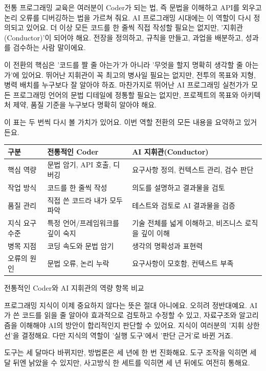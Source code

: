 전통 프로그래밍 교육은 여러분이 Coder가 되는 법, 즉 문법을 이해하고 API를 외우고 논리 오류를 디버깅하는 법을 가르쳐 줘요. AI 프로그래밍 시대에는 이 역할이 다시 정의되고 있어요. 더 이상 모든 코드를 한 줄씩 직접 작성할 필요는 없지만, '지휘관(Conductor)'이 되어야 해요. 전장을 정의하고, 규칙을 만들고, 과업을 배분하고, 성과를 검수하는 사람 말이에요.

이 전환의 핵심은 '코드를 짤 줄 아는가'가 아니라 '무엇을 할지 명확히 생각할 줄 아는가'에 있어요. 뛰어난 지휘관이 꼭 최고의 병사일 필요는 없지만, 전투의 목표와 지형, 병력 배치를 누구보다 잘 알아야 하죠. 마찬가지로 뛰어난 AI 프로그래밍 실천가가 모든 프로그래밍 언어의 문법 디테일에 정통할 필요는 없지만, 프로젝트의 목표와 아키텍처 제약, 품질 기준을 누구보다 명확히 알아야 해요.

이 표는 두 번씩 다시 볼 가치가 있어요. 이번 역할 전환의 모든 내용을 요약하고 있거든요.

\begin{center}
\begin{tabularx}{\linewidth}{|X|X|X|}
\hline
\textbf{구분} & \textbf{전통적인 Coder} & \textbf{AI 지휘관(Conductor)} \tabularnewline
\hline
핵심 역량 & 문법 암기, API 호출, 디버깅 & 요구사항 정의, 컨텍스트 관리, 검수 판단 \tabularnewline
작업 방식 & 코드를 한 줄씩 작성 & 의도를 설명하고 결과물을 검토 \tabularnewline
품질 관리 & 직접 쓴 코드라 내가 모두 파악 & 테스트와 검토로 AI 결과물을 검증 \tabularnewline
지식 요구 수준 & 특정 언어/프레임워크를 깊이 숙지 & 기술 전체를 넓게 이해하고, 비즈니스 로직을 깊이 이해 \tabularnewline
병목 지점 & 코딩 속도와 문법 암기 & 생각의 명확성과 표현력 \tabularnewline
오류의 원인 & 문법 오류, 논리 누락 & 요구사항이 모호함, 컨텍스트 부족 \tabularnewline
\hline
\end{tabularx}
\end{center}

\begin{center}\small\color{gray}전통적인 Coder와 AI 지휘관의 역량 항목 비교\end{center}

프로그래밍 지식이 이제 중요하지 않다는 뜻은 절대 아니에요. 오히려 정반대예요. AI가 쓴 코드를 읽을 줄 알아야 효과적으로 검토하고 수정할 수 있고, 자료구조와 알고리즘을 이해해야 AI의 방안이 합리적인지 판단할 수 있어요. 지식이 여러분의 '지휘 상한선'을 결정해요. 다만 지식의 역할이 '실행 도구'에서 '판단 근거'로 바뀐 거죠.


도구는 세 달마다 바뀌지만, 방법론은 세 년에 한 번 진화해요. 도구 조작을 익히면 세 달 뒤엔 낡았을 수 있지만, 사고방식 한 세트를 익히면 세 년 뒤에도 여전히 통해요.

